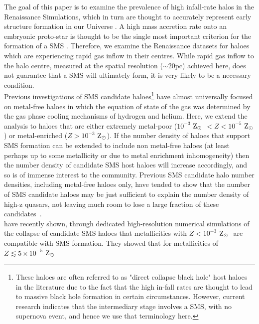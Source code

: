 \documentclass[graphics, twocolumn, usenatbib]{mn2e}
\newcommand{\zsolar} {$\rm{Z_{\odot}}~$}
\newcommand{\zsolarc} {$\rm{Z_{\odot}}$}
\begin{document}
The goal of this paper is to examine the prevalence of high infall-rate halos in the
Renaissance Simulations, which in turn are thought to accurately represent early structure formation in our Universe \citep{Chen_2014, Xu_2013, Xu_2014, OShea_2015,
  Barrow_2017, Wise_2019}. A high mass accretion rate onto an embryonic proto-star is thought to be the
single most important criterion for the formation of a SMS \citep{Hosokawa_2013, Sakurai_2016,
  Woods_2018}. Therefore, we examine the Renaissance datasets for haloes which are experiencing
rapid gas inflow in their centres. While rapid gas inflow to the halo centre, 
measured at the spatial resolution ($\sim 20$pc) achieved here, 
%
does not guarantee
that a SMS will ultimately form, it is very likely to be a necessary condition. \\
\indent Previous investigations of SMS candidate haloes\footnote{These haloes are often
  referred to as "direct collapse black hole" host haloes in the literature due to the fact
  that the high in-fall rates are thought to lead to massive black hole formation in certain
  circumstances. However, current research indicates that the intermediary stage involves a
  SMS, with no supernova event, and hence we use that terminology here.} have almost
universally focused on
metal-free haloes in which the equation of state of the gas was determined by the gas phase
cooling mechanisms of hydrogen and helium. Here, we extend the analysis to haloes that are either
extremely metal-poor ($10^{-3}$ \zsolar $< Z < 10^{-5}$ \zsolarc) or metal-enriched ($Z > 10^{-3}$ \zsolarc). If the number density of haloes that support SMS formation
can be extended to include non metal-free haloes (at least perhaps up to some
metallicity or due to metal enrichment inhomogeneity) then the
number density of candidate SMS host haloes will increase accordingly, and so is of
immense interest to the community. 
Previous SMS candidate halo number densities, including metal-free haloes only,
have tended to show that the number of SMS candidate haloes may be just sufficient to explain the number density of high-z quasars,
not leaving much room to lose a large fraction of these candidates~\citep{Agarwal_2012, Visbal_2014b, Agarwal_2015b, Latif_2014a,
  Valiante_2016, Habouzit_2016, Valiante_2017, Habouzit_2017, Regan_2017}. \\
\indent \cite{Chon_2020} have recently shown, through dedicated high-resolution numerical simulations
of the collapse of candidate SMS haloes that metallicities with $Z < 10^{-3}$ \zsolar
are compatible with SMS formation. They showed that for metallicities of $Z \lesssim 5 \times 10^{-5}$ \zsolar
\end{document}
